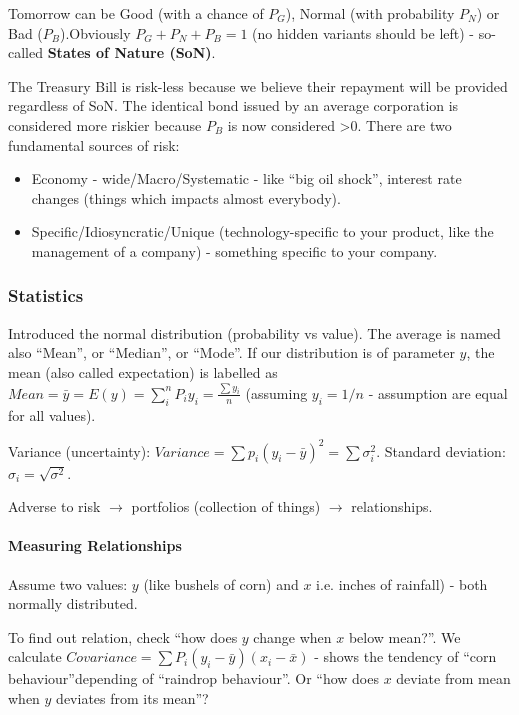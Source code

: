 \documentclass{scrartcl}
\begin{document}
Tomorrow can be Good (with a chance of $P_G$), Normal (with probability $P_N$)
or Bad ($P_B$).Obviously $P_G + P_N + P_B = 1$ (no hidden variants should be
left) - so-called {\bf States of Nature (SoN)}.

The Treasury Bill is risk-less because we believe their repayment will be
provided regardless of SoN. The identical bond issued by an average corporation
is considered more riskier because $P_B$ is now considered >0. There are two
fundamental sources of risk:
\begin{itemize}
\item Economy - wide/Macro/Systematic - like ``big oil shock'', interest rate
  changes (things which impacts almost everybody).
\item Specific/Idiosyncratic/Unique (technology-specific to your product, like
  the management of a company) - something specific to your company.
\end{itemize}

\subsubsection{Statistics}
\label{sec:Statistics}

Introduced the normal distribution (probability vs value). The average is named
also ``Mean'', or ``Median'', or ``Mode''. If our distribution is of parameter
$y$, the mean (also called expectation) is labelled as $Mean = \bar y = E(y) =
\sum \limits_i^n P_i y_i = \frac{\sum y_i}n$ (assuming $y_i = 1/n$ - assumption
are equal for all values).

Variance (uncertainty): $Variance = \sum p_i (y_i - \bar y)^2 = \sum
\sigma_i^2$. Standard deviation: $\sigma_i = \sqrt{\sigma^2}$.

Adverse to risk $\to$ portfolios (collection of things) $\to$ relationships.

\paragraph{Measuring Relationships}
Assume two values: $y$ (like bushels of corn) and $x$ i.e. inches of rainfall) -
both normally distributed.

To find out relation, check ``how does $y$ change when $x$ below mean?''. We
calculate $Covariance = \sum P_i (y_i - \bar y)(x_i - \bar x)$
- shows the tendency of ``corn behaviour''depending of ``raindrop behaviour''.
Or ``how does $x$ deviate from mean when $y$ deviates from its mean''?
\end{document}
